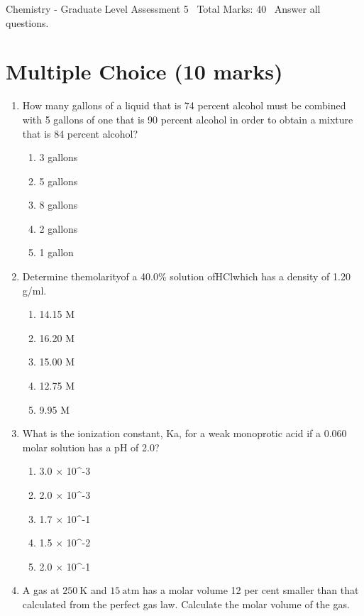\documentclass[12pt]{article}
\begin{document}
\begin{center}
Chemistry - Graduate Level Assessment 5 \
Total Marks: 40 \
Answer all questions.
\end{center}

\section*{Multiple Choice (10 marks)}
\begin{enumerate}[label=\arabic*.]
\item How many gallons of a liquid that is 74 percent alcohol must be combined with 5 gallons of one that is 90 percent alcohol in order to obtain a mixture that is 84 percent alcohol?
\begin{enumerate}[label=(\alph*)]
    \item 3 gallons
    \item 5 gallons
    \item 8 gallons
    \item 2 gallons
    \item 1 gallon
\end{enumerate}
\item Determine themolarityof a 40.0\% solution ofHClwhich has a density of 1.20 g/ml.
\begin{enumerate}[label=(\alph*)]
    \item 14.15 M
    \item 16.20 M
    \item 15.00 M
    \item 12.75 M
    \item 9.95 M
\end{enumerate}
\item What is the ionization constant, Ka, for a weak monoprotic acid if a 0.060 molar solution has a pH of 2.0?
\begin{enumerate}[label=(\alph*)]
    \item 3.0 \ensuremath{\times} 10^-3
    \item 2.0 \ensuremath{\times} 10^-3
    \item 1.7 \ensuremath{\times} 10^-1
    \item 1.5 \ensuremath{\times} 10^-2
    \item 2.0 \ensuremath{\times} 10^-1
\end{enumerate}
\item A gas at $250 \mathrm{~K}$ and $15 \mathrm{~atm}$ has a molar volume 12 per cent smaller than that calculated from the perfect gas law. Calculate the molar volume of the gas.

\end{enumerate}
\end{document}
